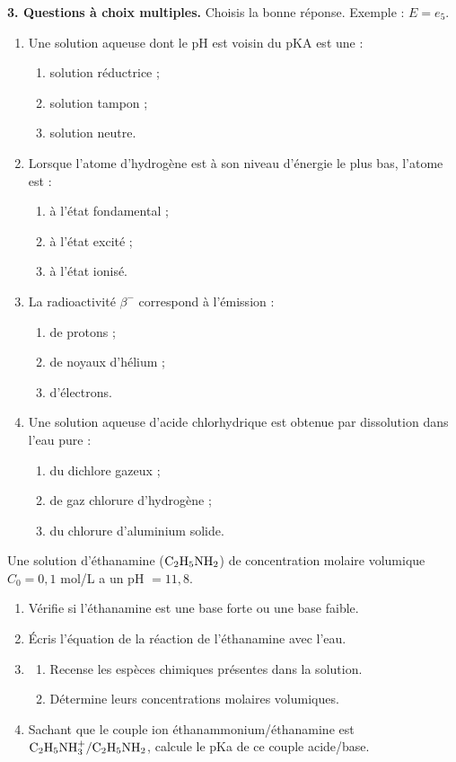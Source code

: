 \documentclass[11pt]{article}
\begin{document}
\noindent\textbf{3. Questions à choix multiples.} Choisis la bonne réponse. Exemple : $E = e_5$.
\begin{enumerate}[label=\alph*.]
  \item Une solution aqueuse dont le pH est voisin du pKA est une :
  \begin{enumerate}[label=a\textsubscript{\arabic*}.]
    \item solution réductrice ;
    \item solution tampon ;
    \item solution neutre.
  \end{enumerate}
  \item Lorsque l'atome d'hydrogène est à son niveau d'énergie le plus bas, l'atome est :
  \begin{enumerate}[label=b\textsubscript{\arabic*}.]
    \item à l'état fondamental ;
    \item à l'état excité ;
    \item à l'état ionisé.
  \end{enumerate}
  \item La radioactivité $\beta^-$ correspond à l'émission :
  \begin{enumerate}[label=c\textsubscript{\arabic*}.]
    \item de protons ;
    \item de noyaux d'hélium ;
    \item d'électrons.
  \end{enumerate}
  \item Une solution aqueuse d'acide chlorhydrique est obtenue par dissolution dans l'eau pure :
  \begin{enumerate}[label=d\textsubscript{\arabic*}.]
    \item du dichlore gazeux ;
    \item de gaz chlorure d'hydrogène ;
    \item du chlorure d'aluminium solide.
  \end{enumerate}
\end{enumerate}

Une solution d'éthanamine ($\mathrm{C_2H_5NH_2}$) de concentration molaire volumique $C_0 = 0{,}1$ mol/L a un pH $= 11{,}8$.

\begin{enumerate}
  \item Vérifie si l'éthanamine est une base forte ou une base faible.
  \item Écris l'équation de la réaction de l'éthanamine avec l'eau.
  \item \begin{enumerate}[label=\alph*.]
    \item Recense les espèces chimiques présentes dans la solution.
    \item Détermine leurs concentrations molaires volumiques.
  \end{enumerate}
  \item Sachant que le couple ion éthanammonium/éthanamine est $\mathrm{C_2H_5NH_3^+/C_2H_5NH_2}$, calcule le pKa de ce couple acide/base.
\end{enumerate}
\end{document}
